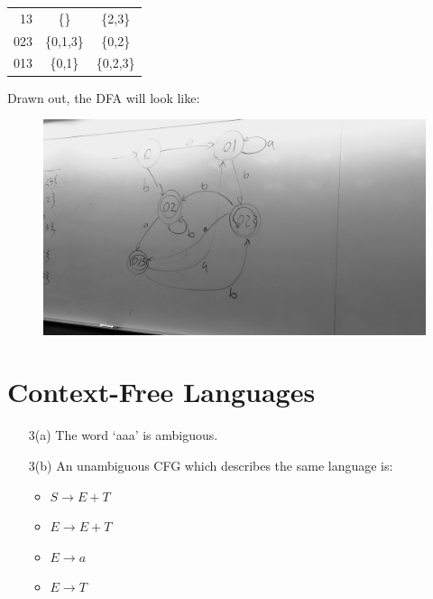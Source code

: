 \documentclass{report}
\begin{document}
\begin{itemize}
\begin{center}
\begin{tabular}{ r || c | c }
13 & \{\} & \{2,3\} \\ 
023 & \{0,1,3\} & \{0,2\} \\ 
013 & \{0,1\} & \{0,2,3\} \\ 
\end{tabular}
\end{center}
Drawn out, the DFA will look like:
\begin{figure}[ht]
\begin{center}
\includegraphics[scale=0.15]{dfa1.jpg}
\end{center}
\end{figure}
\end{itemize}
\section{Context-Free Languages}
\begin{itemize}
\item[3(a)] The word `aaa' is ambiguous.
\item[3(b)] An unambiguous CFG which describes the same language is:
\begin{itemize}
\item $S \rightarrow E + T$
\item $E \rightarrow E + T$
\item $E \rightarrow a$
\item $E \rightarrow T$
\end{itemize}
\end{itemize}
\end{document}
